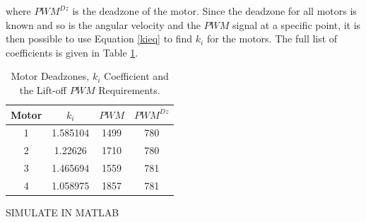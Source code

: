 where $PWM^{Dz}$ is the deadzone of the motor.
Since the deadzone for all motors is known and so is the angular velocity and the $PWM$ signal at a specific point, it is then possible to use Equation \ref{kieq} to find $k_i$ for the motors. The full list of coefficients is given in Table \ref{motorCoeffs}.

\begin{table}[H]
\centering
\begin{tabular}{|c|c|c|c|}
\hline
Motor	& $k_i$ 	& $PWM$ 	& $PWM^{Dz}$ 	\\ \hline
1 		& 1.585104	& 1499		& 780			\\ \hline
2 		& 1.22626	& 1710		& 780			\\ \hline
3 		& 1.465694	& 1559		& 781			\\ \hline
4 		& 1.058975	& 1857		& 781			\\ \hline

\end{tabular}
\caption{Motor Deadzones, $k_i$ Coefficient and the Lift-off $PWM$ Requirements.}
\label{motorCoeffs}
\end{table}

SIMULATE IN MATLAB